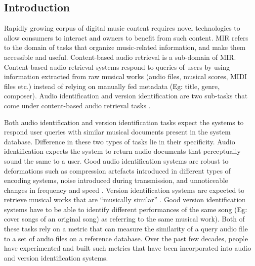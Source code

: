 \documentclass[../main.tex]{subfiles}
\begin{document}
\subsection{Introduction}

\par
Rapidly growing corpus of digital music content requires novel technologies to allow consumers to interact and owners to benefit from such content. \gls{MIR} refers to the domain of tasks that organize music-related information, and make them accessible and useful. Content-based audio retrieval is a sub-domain of \gls{MIR}. Content-based audio retrieval systems respond to queries of users by using information extracted from raw musical works (audio files, musical scores, \gls{MIDI} files etc.) instead of relying on manually fed metadata (Eg: title, genre, composer). Audio identification and version identification are two sub-tasks that come under content-based audio retrieval tasks \cite{book}.

\par
Both audio identification and version identification tasks expect the systems to respond user queries with similar musical documents present in the system database. Difference in these two types of tasks lie in their specificity. Audio identification expects the system to return audio documents that perceptually sound the same to a user. Good audio identification systems are robust to deformations such as compression artefacts introduced in different types of encoding systems, noise introduced during transmission, and unnoticeable changes in frequency and speed \cite{book}. Version identification systems are expected to retrieve musical works that are “musically similar” \cite{serraAudioCoverSong2010}. Good version identification systems have to be able to identify different performances of the same song (Eg: cover songs of an original song) as referring to the same musical work). Both of these tasks rely on a metric that can measure the similarity of a query audio file to a set of audio files on a reference database. Over the past few decades, people have experimented and built such metrics that have been incorporated into audio and version identification systems.
\end{document}
